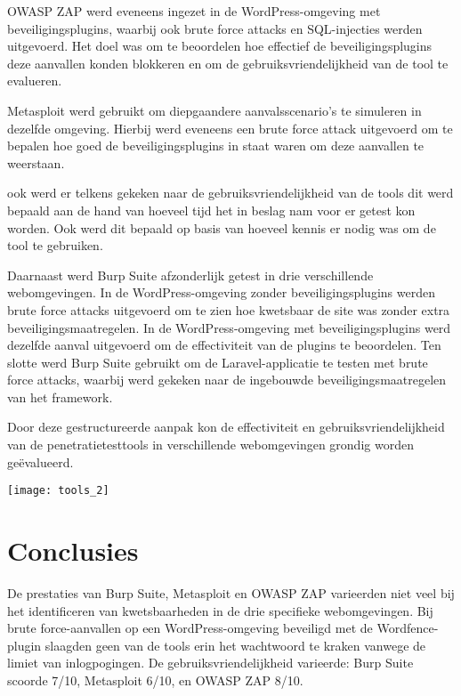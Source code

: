 \documentclass[a0,portrait]{hogent-poster}
\begin{document}
\begin{multicols}{2}
OWASP ZAP werd eveneens ingezet in de WordPress-omgeving met beveiligingsplugins, waarbij ook brute force attacks 
en SQL-injecties werden uitgevoerd. Het doel was om te beoordelen hoe effectief de beveiligingsplugins deze aanvallen 
konden blokkeren en om de gebruiksvriendelijkheid van de tool te evalueren.

Metasploit werd gebruikt om diepgaandere aanvalsscenario's te simuleren in dezelfde omgeving. Hierbij werd eveneens een
brute force attack uitgevoerd om te bepalen hoe goed de beveiligingsplugins in staat waren om deze  aanvallen 
te weerstaan.

ook werd er telkens gekeken naar de gebruiksvriendelijkheid van de tools dit werd bepaald aan de hand van hoeveel 
tijd het in beslag nam voor er getest kon worden. Ook werd dit bepaald op basis van hoeveel kennis er nodig was om 
de tool te gebruiken.

Daarnaast werd Burp Suite afzonderlijk getest in drie verschillende webomgevingen. In de WordPress-omgeving zonder 
beveiligingsplugins werden brute force attacks uitgevoerd om te zien hoe kwetsbaar de site was zonder 
extra beveiligingsmaatregelen. In de WordPress-omgeving met beveiligingsplugins werd dezelfde aanval uitgevoerd om 
de effectiviteit van de plugins te beoordelen. Ten slotte werd Burp Suite gebruikt om de Laravel-applicatie te testen met 
brute force attacks, waarbij werd gekeken naar de ingebouwde beveiligingsmaatregelen van het framework.

Door deze gestructureerde aanpak kon de effectiviteit en gebruiksvriendelijkheid van de penetratietesttools in 
verschillende webomgevingen grondig worden geëvalueerd.

\begin{center}
  \captionsetup{type=figure}
  \texttt{[image: tools\_2]}
\end{center}


\section{Conclusies}
De prestaties van Burp Suite, Metasploit en OWASP ZAP varieerden niet veel bij het identificeren van kwetsbaarheden in de 
drie specifieke webomgevingen. Bij brute force-aanvallen op een WordPress-omgeving beveiligd met de Wordfence-plugin 
slaagden geen van de tools erin het wachtwoord te kraken vanwege de limiet van inlogpogingen. De gebruiksvriendelijkheid 
varieerde: Burp Suite scoorde 7/10, Metasploit 6/10, en OWASP ZAP 8/10.


\end{multicols}
\end{document}
